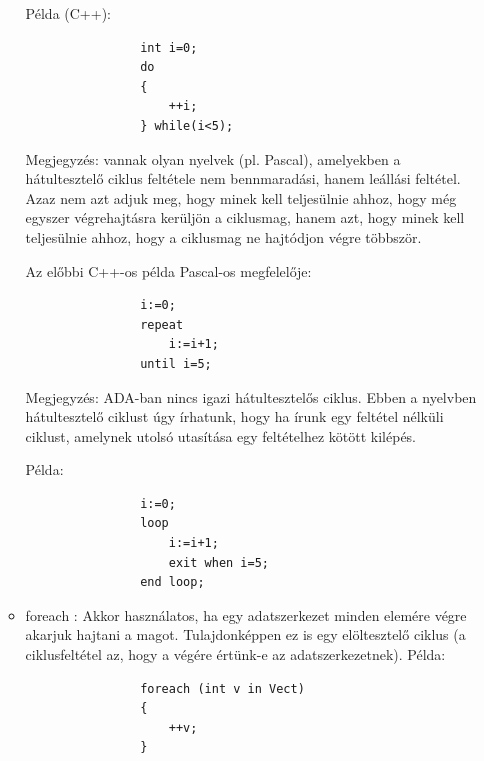 \documentclass[margin=0px]{article}
\begin{document}
\begin{itemize}
\begin{itemize}
                    Példa (C++):

                    \begin{verbatim}
                int i=0;
                do
                {
                    ++i;
                } while(i<5);
            \end{verbatim}

                    Megjegyzés: vannak olyan nyelvek (pl. Pascal), amelyekben a hátultesztelő ciklus feltétele nem bennmaradási, hanem
                    leállási feltétel. Azaz nem azt adjuk meg, hogy minek kell teljesülnie ahhoz, hogy még egyszer végrehajtásra kerüljön
                    a ciklusmag, hanem azt, hogy minek kell teljesülnie ahhoz, hogy a ciklusmag ne hajtódjon végre többször.

                    Az előbbi C++-os példa Pascal-os megfelelője:
                    \begin{verbatim}
                i:=0;
                repeat
                    i:=i+1;
                until i=5;
            \end{verbatim}

                    Megjegyzés: ADA-ban nincs igazi hátultesztelős ciklus. Ebben a nyelvben hátultesztelő ciklust úgy írhatunk, hogy ha
                    írunk egy feltétel nélküli ciklust, amelynek utolsó utasítása egy feltételhez kötött kilépés.

                    Példa:
                    \begin{verbatim}
                i:=0;
                loop
                    i:=i+1;
                    exit when i=5;
                end loop;
            \end{verbatim}


              \item	foreach : Akkor használatos, ha egy adatszerkezet minden elemére végre akarjuk hajtani a magot.
                    Tulajdonképpen ez is egy elöltesztelő ciklus (a ciklusfeltétel az, hogy a végére értünk-e az
                    adatszerkezetnek).
                    Példa:
                    \begin{verbatim}
                foreach (int v in Vect)
                {
                    ++v;
                }
            \end{verbatim}


\end{itemize}
\end{itemize}
\end{document}
